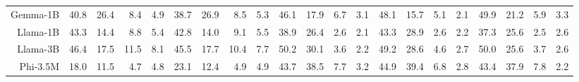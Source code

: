 \documentclass[letterpaper]{article}
\begin{document}
\begin{table}[t]
{\begin{tabular}{rrrrr|rrrr|rrrr|rrrr|rrrr}
Gemma-1B & \cellcolor[HTML]{EFEFCC}40.8 & \cellcolor[HTML]{FEEBCC}26.4 & \cellcolor[HTML]{F9D3CC}8.4 & \cellcolor[HTML]{F8CFCC}4.9 & \cellcolor[HTML]{F1EFCC}38.7 & \cellcolor[HTML]{FEEDCC}26.9 & \cellcolor[HTML]{FAD4CC}8.5 & \cellcolor[HTML]{F9D0CC}5.3 & \cellcolor[HTML]{D4EACC}46.1 & \cellcolor[HTML]{FDE7CC}17.9 & \cellcolor[HTML]{FAD6CC}6.7 & \cellcolor[HTML]{F9D0CC}3.1 & \cellcolor[HTML]{CEE8CC}48.1 & \cellcolor[HTML]{FCE3CC}15.7 & \cellcolor[HTML]{F9D2CC}5.1 & \cellcolor[HTML]{F8CECC}2.1 & \cellcolor[HTML]{CCE8CC}49.9 & \cellcolor[HTML]{FEECCC}21.2 & \cellcolor[HTML]{FAD4CC}5.9 & \cellcolor[HTML]{F9D0CC}3.3 \\
Llama-1B & \cellcolor[HTML]{EBEECC}43.3 & \cellcolor[HTML]{FBDBCC}14.4 & \cellcolor[HTML]{F9D4CC}8.8 & \cellcolor[HTML]{F9CFCC}5.4 & \cellcolor[HTML]{EAEECC}42.8 & \cellcolor[HTML]{FBDBCC}14.0 & \cellcolor[HTML]{FAD5CC}9.1 & \cellcolor[HTML]{F9D0CC}5.5 & \cellcolor[HTML]{E3EDCC}38.9 & \cellcolor[HTML]{FDF2CC}26.4 & \cellcolor[HTML]{F9CFCC}2.6 & \cellcolor[HTML]{F9CFCC}2.1 & \cellcolor[HTML]{D8EACC}43.3 & \cellcolor[HTML]{F7F0CC}28.9 & \cellcolor[HTML]{F8CECC}2.6 & \cellcolor[HTML]{F8CECC}2.2 & \cellcolor[HTML]{E6EDCC}37.3 & \cellcolor[HTML]{FEF2CC}25.6 & \cellcolor[HTML]{F9CFCC}2.5 & \cellcolor[HTML]{F9CFCC}2.6 \\
Llama-3B & \cellcolor[HTML]{E6EDCC}46.4 & \cellcolor[HTML]{FCDFCC}17.5 & \cellcolor[HTML]{FAD7CC}11.5 & \cellcolor[HTML]{F9D3CC}8.1 & \cellcolor[HTML]{E5EDCC}45.5 & \cellcolor[HTML]{FCE0CC}17.7 & \cellcolor[HTML]{FAD7CC}10.4 & \cellcolor[HTML]{F9D3CC}7.7 & \cellcolor[HTML]{CCE8CC}50.2 & \cellcolor[HTML]{F5F0CC}30.1 & \cellcolor[HTML]{F9D1CC}3.6 & \cellcolor[HTML]{F9CFCC}2.2 & \cellcolor[HTML]{CCE8CC}49.2 & \cellcolor[HTML]{F8F1CC}28.6 & \cellcolor[HTML]{F9D2CC}4.6 & \cellcolor[HTML]{F8CFCC}2.7 & \cellcolor[HTML]{CCE8CC}50.0 & \cellcolor[HTML]{FEF2CC}25.6 & \cellcolor[HTML]{F9D1CC}3.7 & \cellcolor[HTML]{F9CFCC}2.6 \\
Phi-3.5M & \cellcolor[HTML]{FCE0CC}18.0 & \cellcolor[HTML]{FAD7CC}11.5 & \cellcolor[HTML]{F8CECC}4.7 & \cellcolor[HTML]{F8CFCC}4.8 & \cellcolor[HTML]{FDE8CC}23.1 & \cellcolor[HTML]{FAD9CC}12.4 & \cellcolor[HTML]{F9CFCC}4.9 & \cellcolor[HTML]{F9CFCC}4.9 & \cellcolor[HTML]{D9EBCC}43.7 & \cellcolor[HTML]{E4EDCC}38.5 & \cellcolor[HTML]{FAD7CC}7.7 & \cellcolor[HTML]{F9D0CC}3.2 & \cellcolor[HTML]{D5EACC}44.9 & \cellcolor[HTML]{E1ECCC}39.4 & \cellcolor[HTML]{FAD5CC}6.8 & \cellcolor[HTML]{F8CFCC}2.8 & \cellcolor[HTML]{DAEBCC}43.4 & \cellcolor[HTML]{E5EDCC}37.9 & \cellcolor[HTML]{FAD7CC}7.8 & \cellcolor[HTML]{F8CFCC}2.2 \\

\end{tabular}}
\end{table}
\end{document}
